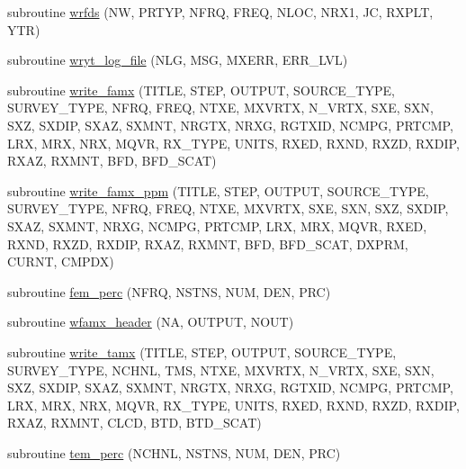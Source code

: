 \begin{DoxyCompactItemize}
\item 
subroutine \hyperlink{Marco_8f90_a9de61739c99930796cb75809668c8f06}{wrfds} (NW, P\+R\+T\+YP, N\+F\+RQ, F\+R\+EQ, N\+L\+OC, N\+R\+X1, JC, R\+X\+P\+LT, Y\+TR)
\item 
subroutine \hyperlink{Marco_8f90_a0c927c234a83d54d97adddd80a2c26ff}{wryt\+\_\+log\+\_\+file} (N\+LG, M\+SG, M\+X\+E\+RR, E\+R\+R\+\_\+\+L\+VL)
\item 
subroutine \hyperlink{Marco_8f90_a40bbec6873c0b2861fc37b59000aa0b2}{write\+\_\+famx} (T\+I\+T\+LE, S\+T\+EP, O\+U\+T\+P\+UT, S\+O\+U\+R\+C\+E\+\_\+\+T\+Y\+PE, S\+U\+R\+V\+E\+Y\+\_\+\+T\+Y\+PE, N\+F\+RQ, F\+R\+EQ, N\+T\+XE, M\+X\+V\+R\+TX, N\+\_\+\+V\+R\+TX, S\+XE, S\+XN, S\+XZ, S\+X\+D\+IP, S\+X\+AZ, S\+X\+M\+NT, N\+R\+G\+TX, N\+R\+XG, R\+G\+T\+X\+ID, N\+C\+M\+PG, P\+R\+T\+C\+MP, L\+RX, M\+RX, N\+RX, M\+Q\+VR, R\+X\+\_\+\+T\+Y\+PE, U\+N\+I\+TS, R\+X\+ED, R\+X\+ND, R\+X\+ZD, R\+X\+D\+IP, R\+X\+AZ, R\+X\+M\+NT, B\+FD, B\+F\+D\+\_\+\+S\+C\+AT)
\item 
subroutine \hyperlink{Marco_8f90_a070336a40b8f842208e0209c5ba7bb75}{write\+\_\+famx\+\_\+ppm} (T\+I\+T\+LE, S\+T\+EP, O\+U\+T\+P\+UT, S\+O\+U\+R\+C\+E\+\_\+\+T\+Y\+PE, S\+U\+R\+V\+E\+Y\+\_\+\+T\+Y\+PE, N\+F\+RQ, F\+R\+EQ, N\+T\+XE, M\+X\+V\+R\+TX, S\+XE, S\+XN, S\+XZ, S\+X\+D\+IP, S\+X\+AZ, S\+X\+M\+NT, N\+R\+XG, N\+C\+M\+PG, P\+R\+T\+C\+MP, L\+RX, M\+RX, M\+Q\+VR, R\+X\+ED, R\+X\+ND, R\+X\+ZD, R\+X\+D\+IP, R\+X\+AZ, R\+X\+M\+NT, B\+FD, B\+F\+D\+\_\+\+S\+C\+AT, D\+X\+P\+RM, C\+U\+R\+NT, C\+M\+P\+DX)
\item 
subroutine \hyperlink{Marco_8f90_afd1cc93ca825c04293fe19df43045f99}{fem\+\_\+perc} (N\+F\+RQ, N\+S\+T\+NS, N\+UM, D\+EN, P\+RC)
\item 
subroutine \hyperlink{Marco_8f90_a2bc01734a74feed58986986ff793df0b}{wfamx\+\_\+header} (NA, O\+U\+T\+P\+UT, N\+O\+UT)
\item 
subroutine \hyperlink{Marco_8f90_a19af5e29ee475d2389b569fea2f1a91d}{write\+\_\+tamx} (T\+I\+T\+LE, S\+T\+EP, O\+U\+T\+P\+UT, S\+O\+U\+R\+C\+E\+\_\+\+T\+Y\+PE, S\+U\+R\+V\+E\+Y\+\_\+\+T\+Y\+PE, N\+C\+H\+NL, T\+MS, N\+T\+XE, M\+X\+V\+R\+TX, N\+\_\+\+V\+R\+TX, S\+XE, S\+XN, S\+XZ, S\+X\+D\+IP, S\+X\+AZ, S\+X\+M\+NT, N\+R\+G\+TX, N\+R\+XG, R\+G\+T\+X\+ID, N\+C\+M\+PG, P\+R\+T\+C\+MP, L\+RX, M\+RX, N\+RX, M\+Q\+VR, R\+X\+\_\+\+T\+Y\+PE, U\+N\+I\+TS, R\+X\+ED, R\+X\+ND, R\+X\+ZD, R\+X\+D\+IP, R\+X\+AZ, R\+X\+M\+NT, C\+L\+CD, B\+TD, B\+T\+D\+\_\+\+S\+C\+AT)
\item 
subroutine \hyperlink{Marco_8f90_a130e19214a557786f1a455a211b9c738}{tem\+\_\+perc} (N\+C\+H\+NL, N\+S\+T\+NS, N\+UM, D\+EN, P\+RC)

\end{DoxyCompactItemize}
